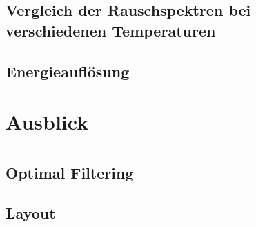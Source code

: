 \documentclass{include/thesisclass}
\begin{document}
    \section{Vergleich der Rauschspektren bei verschiedenen Temperaturen}
    
    \section{Energieauflösung}
	
    
    \chapter{Ausblick}
    







    \TheBibliography

    
    \printbibliography
	\listoffigures {}
    \Appendix
    \chapter{\appendixname} %
    \section{Optimal Filtering}\label{sec:OpFiltering}
    \label{sec:OptFilt}
    \section{Layout}
    
\end{document}
